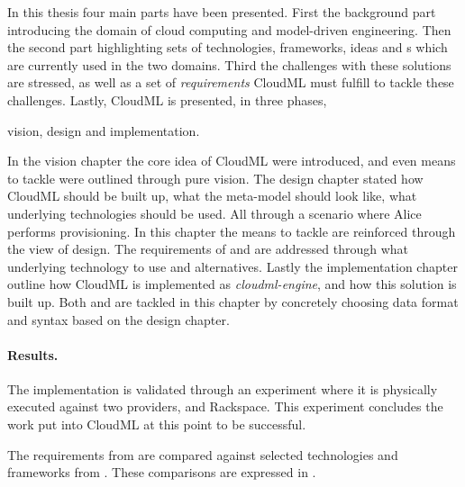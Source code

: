 
In this thesis four main parts have been presented.
First the background part introducing the domain of cloud computing and model-driven engineering.
Then the second part highlighting sets of technologies, frameworks, ideas and 
s which are currently used in the two domains.
Third the challenges with these solutions are stressed, as well as a set of \emph{requirements}
CloudML must fulfill to tackle these challenges.
Lastly, CloudML is presented, in three phases,
\begin{ii}
  \iitem vision,
  \iitem design and
  \iitem implementation.
\end{ii}

In the vision chapter the core idea of CloudML were introduced,
and even means to tackle  were outlined through pure vision.
The design chapter stated how CloudML should be built up,
what the meta-model should look like,
what underlying technologies should be used.
All through a scenario where Alice performs provisioning.
In this chapter the means to tackle  are reinforced through
the view of design.
The requirements of  and 
are addressed through what underlying technology to use and alternatives.
Lastly the implementation chapter outline how CloudML is implemented
as \emph{cloudml-engine}, and how this solution is built up.
Both  and  are tackled in this chapter
by concretely choosing data format and syntax based on the design chapter.

\paragraph{Results.}


The implementation is validated through an experiment where
it is physically executed against two providers,  and Rackspace.
This experiment concludes the work put into CloudML at this point to be successful.

The requirements from  are compared against selected
technologies and frameworks from .
These comparisons are expressed in .


